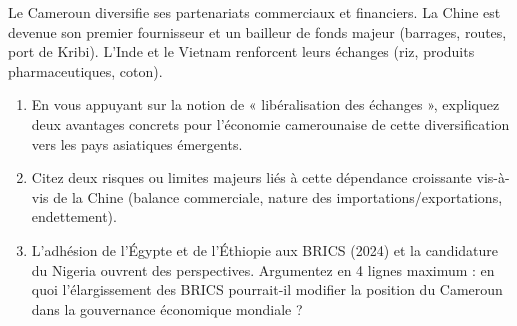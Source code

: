 \documentclass[11pt]{article}
\begin{document}
\begin{exercice}
Le Cameroun diversifie ses partenariats commerciaux et financiers. La Chine est devenue son premier fournisseur et un bailleur de fonds majeur (barrages, routes, port de Kribi). L'Inde et le Vietnam renforcent leurs échanges (riz, produits pharmaceutiques, coton).

\begin{enumerate}
    \item En vous appuyant sur la notion de « libéralisation des échanges », expliquez deux avantages concrets pour l'économie camerounaise de cette diversification vers les pays asiatiques émergents.
    \item Citez deux risques ou limites majeurs liés à cette dépendance croissante vis-à-vis de la Chine (balance commerciale, nature des importations/exportations, endettement).
    \item L'adhésion de l'Égypte et de l'Éthiopie aux BRICS (2024) et la candidature du Nigeria ouvrent des perspectives. Argumentez en 4 lignes maximum : en quoi l'élargissement des BRICS pourrait-il modifier la position du Cameroun dans la gouvernance économique mondiale ?
\end{enumerate}
\end{exercice}
\end{document}

